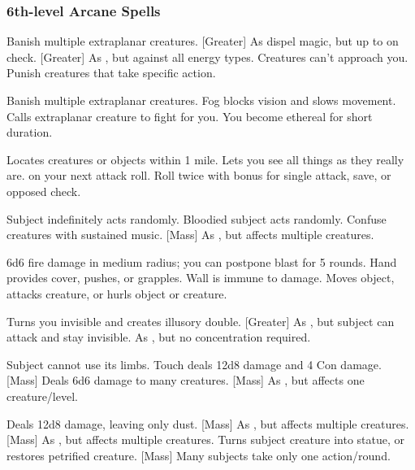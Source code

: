 \subsubsection{6th-level Arcane Spells} 
\begin{swspelllist}
     Banish multiple extraplanar creatures. 
    [Greater] As dispel magic, but up to  on check.
    [Greater] As , but against all energy types.
     Creatures can't approach you.
     Punish creatures that take specific action.

     Banish multiple extraplanar creatures. 
     Fog blocks vision and slows movement.
     Calls extraplanar creature to fight for you.
     You become ethereal for short duration.

     Locates creatures or objects within 1 mile.
    \M Lets you see all things as they really are.
      on your next attack roll.
     Roll twice with bonus for single attack, save, or opposed check.

     Subject indefinitely acts randomly.
     Bloodied subject acts randomly.
     Confuse creatures with sustained music.
    [Mass] As , but affects multiple creatures.

     6d6 fire damage in medium radius; you can postpone blast for 5 rounds.
     Hand provides cover, pushes, or grapples.
     Wall is immune to damage.
     Moves object, attacks creature, or hurls object or creature.

     Turns you invisible and creates illusory double.
    [Greater] As , but subject can attack and stay invisible.
     As , but no concentration required.

     Subject cannot use its limbs. 
     Touch deals 12d8 damage and 4 Con damage.
    [Mass] Deals 6d6 damage to many creatures.
    [Mass] As , but affects one creature/level.

     Deals 12d8 damage, leaving only dust.
    [Mass] As , but affects multiple creatures.
    [Mass] As , but affects multiple creatures.
     Turns subject creature into statue, or restores petrified creature.
    [Mass] Many subjects take only one action/round.
\end{swspelllist}

